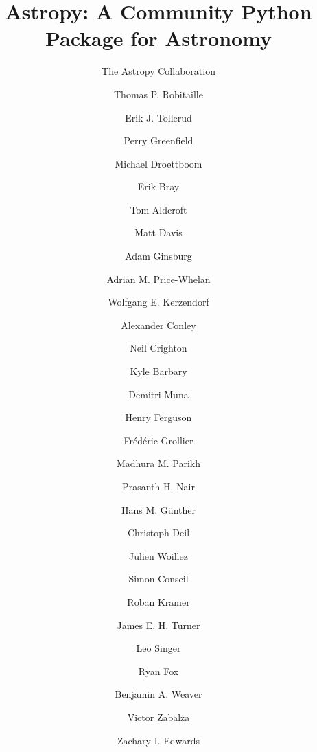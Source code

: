 \documentclass[traditabstract]{aa}
\begin{document}



\title{Astropy: A Community Python Package for Astronomy}




\author{
The Astropy Collaboration
  \and
Thomas P. Robitaille\inst{\ref{inst:mpia}}  %
  \and
Erik J. Tollerud\inst{\ref{inst:yale}, \ref{inst:hubble}}  %
  \and
Perry Greenfield\inst{\ref{inst:stsci}}  %
  \and
Michael Droettboom\inst{\ref{inst:stsci}}  %
  \and
Erik Bray\inst{\ref{inst:stsci}}  %
  \and
Tom Aldcroft\inst{\ref{inst:cfa}}  %
  \and
Matt Davis\inst{\ref{inst:stsci}}  %
  \and
Adam Ginsburg\inst{\ref{inst:colorado}}  %
  \and
Adrian M. Price-Whelan\inst{\ref{inst:columbia}}  %
  \and
Wolfgang E. Kerzendorf\inst{\ref{inst:toronto}}  %
  \and
Alexander Conley\inst{\ref{inst:colorado}}  %
  \and
Neil Crighton\inst{\ref{inst:mpia}}  %
  \and
Kyle Barbary\inst{\ref{inst:argonne}}  %
  \and
Demitri Muna\inst{\ref{inst:osu}}  %
  \and
Henry Ferguson\inst{\ref{inst:stsci}}  %
  \and
Fr\'ed\'eric Grollier\inst{\ref{inst:freelance}}  %
  \and
Madhura M. Parikh\inst{\ref{inst:surat}}  %
  \and
Prasanth H. Nair\inst{\ref{inst:freelance}}  %
  \and
Hans M. G\"unther\inst{\ref{inst:cfa}}  %
  \and
Christoph Deil\inst{\ref{inst:mpik}}  %
  \and
Julien Woillez\inst{\ref{inst:eso_garching}}  %
  \and
Simon Conseil\inst{\ref{inst:oamp}}  %
  \and
Roban Kramer\inst{\ref{inst:eth}}  %
  \and
James E. H. Turner\inst{\ref{inst:gemini_s}}  %
  \and
Leo Singer\inst{\ref{inst:ligo}}  %
  \and
Ryan Fox\inst{\ref{inst:freelance}}  %
  \and
Benjamin A. Weaver\inst{\ref{inst:nyu}}  %
  \and
Victor Zabalza\inst{\ref{inst:mpik}}  %
  \and
Zachary I. Edwards\inst{\ref{inst:louisiana}}  %
  \and
}
\end{document}
